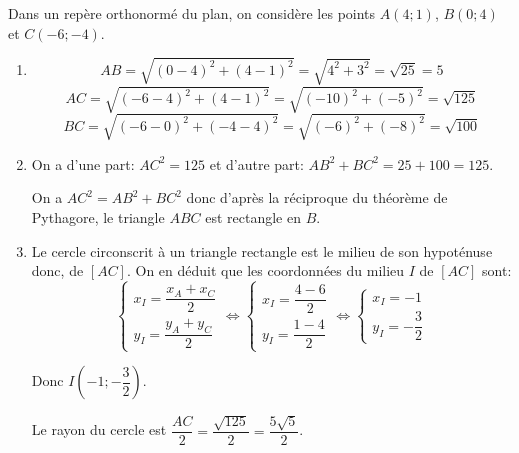 \documentclass[a4paper]{article}
\begin{document}
    \medskip
    \begin{exercice}{}{}
    Dans un repère orthonormé du plan, on considère les points $A(4;1)$, $B(0;4)$ et $C(-6;-4)$.
    \begin{enumerate}
        \item 

        $$AB=\sqrt{(0-4)^2+(4-1)^2}=\sqrt{4^2+3^2}=\sqrt{25}=5$$
        $$AC=\sqrt{(-6-4)^2+(4-1)^2}=\sqrt{(-10)^2+(-5)^2}=\sqrt{125}$$
        $$BC=\sqrt{(-6-0)^2+(-4-4)^2}=\sqrt{(-6)^2+(-8)^2}=\sqrt{100}$$

        \item On a d'une part: $AC^2=125$ et d'autre part: $AB^2+BC^2=25+100=125$.

        On a $AC^2=AB^2+BC^2$ donc d'après la réciproque du théorème de Pythagore, le triangle $ABC$ est rectangle en $B$.
        
        \item  Le cercle circonscrit à un triangle rectangle est le milieu de son hypoténuse donc, de $[AC]$.
        On en déduit que les coordonnées du milieu $I$ de $[AC]$ sont:
        $$
        \left\{
            \begin{array}{ll}
                x_I=\dfrac{x_A+x_C}{2} \\
                y_I=\dfrac{y_A+y_C}{2}
            \end{array}
        \right.\iff
        \left\{
            \begin{array}{ll}
                x_I=\dfrac{4-6}{2} \\
                y_I=\dfrac{1-4}{2}
            \end{array}
        \right.\iff
        \left\{
            \begin{array}{ll}
                x_I=-1 \\
                y_I=-\dfrac{3}{2}
            \end{array}
        \right.
        $$

        Donc $I\left(-1;-\dfrac{3}{2}\right)$.
        
        Le rayon du cercle est $\dfrac{AC}{2}=\dfrac{\sqrt{125}}{2}=\dfrac{5\sqrt{5}}{2}$.
    
    
    \end{enumerate}
        
    \end{exercice}
    \pagebreak
\end{document}
